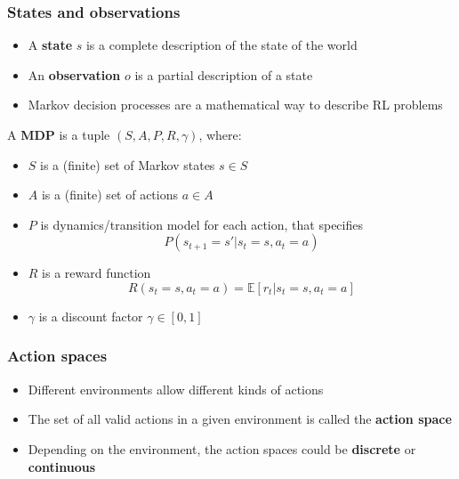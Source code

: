 \documentclass[9pt]{beamer}
\newcommand{\E}{{\mathbb E}}
\begin{document}
\begin{frame}
\frametitle{States and observations}

\begin{itemize}

\item A \textbf{state} $s$ is a complete description of the state of the world
\item An \textbf{observation} $o$ is a partial description of a state
\item Markov decision processes are a mathematical way to describe RL problems

\end{itemize}

\begin{definition}
	A \textbf{MDP} is a tuple $(S,A, P, R, \gamma)$, where:
	\begin{itemize}
		\item $S$ is a (finite) set of Markov states $s \in S$
		\item $A$ is a (finite) set of actions $a \in A$
		\item $P$ is dynamics/transition model for each action, that specifies
		\begin{equation}
			P(s_{t+1} =s'|s_t =s,a_t =a)	
		\end{equation}
		\item $R$ is a reward function
		\begin{equation}
			R(s_t =s,a_t =a)=\E[r_t|s_t =s,a_t =a]	
		\end{equation}
		
		\item $\gamma$ is a discount factor $\gamma \in [0,1]$
	\end{itemize}
\end{definition}

\end{frame}




\begin{frame}
	\frametitle{Action spaces}
	\begin{itemize}
		\item Different environments allow different kinds of actions
		\item The set of all valid actions in a given environment is called the \textbf{action space}
		\item Depending on the environment, the action spaces could be \textbf{discrete} or \textbf{continuous}
	\end{itemize}
\end{frame}
\end{document}
